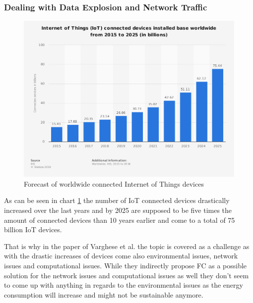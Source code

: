 \subsubsection{Dealing with Data Explosion and Network Traffic}\hspace*{\fill}
\begin{figure}[h]
    \centering
    \includegraphics[width=1\textwidth,height=0.8\textwidth]{resources/images/global_iot_devices.png}
    \caption{Forecast of worldwide connected Internet of Things devices \cite{statista1}}
    \label{fig:global_iot_devices}
\end{figure}

As can be seen in chart \ref{fig:global_iot_devices} the number of IoT connected devices drastically increased over the last years and by 2025 are supposed to be five times the amount of connected devices than 10 years earlier and come to a total of 75 billion IoT devices.

That is why in the paper of Varghese et al. \cite{7796149} the topic is covered as a challenge as with the drastic increases of devices come also environmental issues, network issues and computational issues.
While they indirectly propose FC as a possible solution for the network issues and computational issues as well they don’t seem to come up with anything in regards to the environmental issues as the energy consumption will increase and might not be sustainable anymore.

